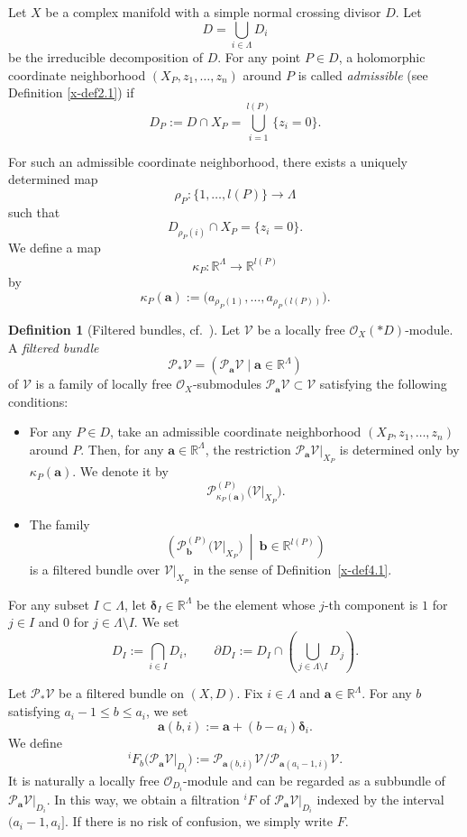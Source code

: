 \documentclass[12pt,twoside]{amsart}
\theoremstyle{definition}
\newtheorem{defn}[thm]{Definition}
\begin{document}
Let $X$ be a complex manifold with a simple normal crossing divisor $D$.
Let
\[
D = \bigcup_{i \in \Lambda} D_i
\]
be the irreducible decomposition of $D$.
For any point $P \in D$, a holomorphic coordinate neighborhood
$(X_P, z_1, \ldots, z_n)$ around $P$ is called \emph{admissible} 
(see Definition \ref{x-def2.1}) if
\[
D_P := D \cap X_P = \bigcup_{i=1}^{l(P)} \{ z_i = 0 \}.
\]

For such an admissible coordinate neighborhood, there exists a uniquely
determined map
\[
\rho_P \colon \{1,\ldots,l(P)\} \longrightarrow \Lambda
\]
such that
\[
D_{\rho_P(i)} \cap X_P = \{ z_i = 0 \}.
\]
We define a map
\[
\kappa_P \colon \mathbb R^{\Lambda} \longrightarrow \mathbb R^{l(P)}
\]
by
\[
\kappa_P(\bm a) :=
\bigl( a_{\rho_P(1)}, \ldots, a_{\rho_P(l(P))} \bigr).
\]

\begin{defn}[{Filtered bundles, cf.~\cite[2.3.3]{mochizuki5}}]
\label{x-def4.2}
Let $\mathcal V$ be a locally free $\mathcal O_X(\ast D)$-module.
A \emph{filtered bundle}
\[
\mathcal P_\ast \mathcal V
=
\left(
\mathcal P_{\bm a} \mathcal V \mid \bm a \in \mathbb R^{\Lambda}
\right)
\]
of $\mathcal V$ is a family of locally free $\mathcal O_X$-submodules
$\mathcal P_{\bm a} \mathcal V \subset \mathcal V$
satisfying the following conditions:
\begin{itemize}
\item[(1)]
For any $P \in D$, take an admissible coordinate neighborhood
$(X_P, z_1, \ldots, z_n)$ around $P$.
Then, for any $\bm a \in \mathbb R^{\Lambda}$,
the restriction $\mathcal P_{\bm a} \mathcal V|_{X_P}$
is determined only by $\kappa_P(\bm a)$.
We denote it by
\[
\mathcal P^{(P)}_{\kappa_P(\bm a)}
\bigl( \mathcal V|_{X_P} \bigr).
\]

\item[(2)]
The family
\[
\left(
\mathcal P^{(P)}_{\bm b}
\bigl( \mathcal V|_{X_P} \bigr)
\ \middle|\ 
\bm b \in \mathbb R^{l(P)}
\right)
\]
is a filtered bundle over $\mathcal V|_{X_P}$ in the sense of
Definition~\ref{x-def4.1}.
\end{itemize}
\end{defn}

For any subset $I \subset \Lambda$, let $\bm\delta_I \in \mathbb R^\Lambda$
be the element whose $j$-th component is $1$ for $j \in I$ and $0$ for
$j \in \Lambda \setminus I$.
We set
\[
D_I := \bigcap_{i \in I} D_i,
\qquad
\partial D_I :=
D_I \cap \left( \bigcup_{j \in \Lambda \setminus I} D_j \right).
\]

Let $\mathcal P_\ast \mathcal V$ be a filtered bundle on $(X,D)$.
Fix $i \in \Lambda$ and $\bm a \in \mathbb R^\Lambda$.
For any $b$ satisfying $a_i-1 \le b \le a_i$, we set
\[
\bm a(b,i) := \bm a + (b-a_i)\bm\delta_i .
\]
We define
\[
{}^i\!F_b
\bigl( \mathcal P_{\bm a} \mathcal V|_{D_i} \bigr)
:=
\mathcal P_{\bm a(b,i)} \mathcal V
\big/
\mathcal P_{\bm a(a_i-1,i)} \mathcal V .
\]
It is naturally a locally free $\mathcal O_{D_i}$-module and can be
regarded as a subbundle of
$\mathcal P_{\bm a} \mathcal V|_{D_i}$.
In this way, we obtain a filtration ${}^i\!F$ of
$\mathcal P_{\bm a} \mathcal V|_{D_i}$ indexed by the interval
$(a_i-1,a_i]$.
If there is no risk of confusion, we simply write $F$.
\end{document}
